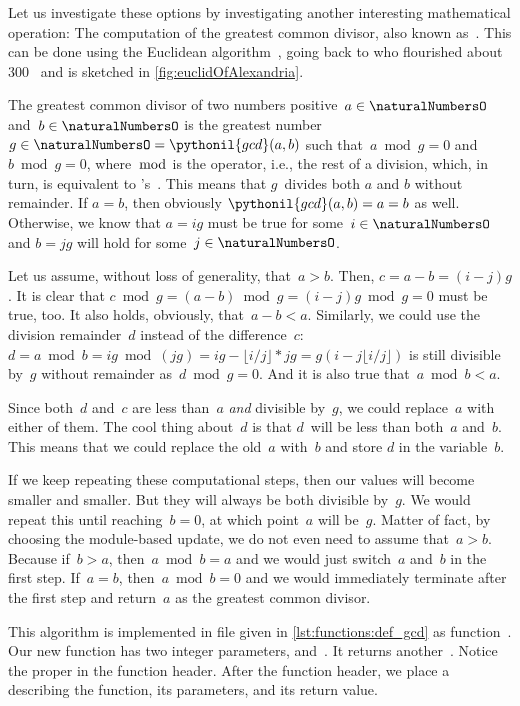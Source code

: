 Let us investigate these options by investigating another interesting mathematical operation:
The computation of the greatest common divisor, also known as~.
This can be done using the Euclidean algorithm~\cite{EHF2008EEOGTGOJLH11FEEEELIEILHIATBG11EAPWMETBFR:ENT,B1999FAOTBEA,TKY2016BEOEAOTCEG}, going back to \citeauthor{EHF2008EEOGTGOJLH11FEEEELIEILHIATBG11EAPWMETBFR:ENT} who flourished about 300~ and is sketched in \cref{fig:euclidOfAlexandria}.

The greatest common divisor of two numbers positive~$a\in\naturalNumbersO$ and~$b\in\naturalNumbersO$ is the greatest number~$g\in\naturalNumbersO=\pythonil{gcd}(a,b)$ such that~$a\bmod g=0$ and~$b \bmod g=0$, where~$\bmod$ is the  operator, i.e., the rest of a division, which, in turn, is equivalent to \python's~\pythonilIdx{\%}.
This means that $g$~divides both $a$ and $b$ without remainder.
If $a=b$, then obviously $\pythonil{gcd}(a,b)=a=b$ as well.
Otherwise, we know that $a=ig$ must be true for some~$i\in\naturalNumbersO$ and $b=jg$ will hold for some~$j\in\naturalNumbersO$.

Let us assume, without loss of generality, that~$a>b$.
Then, $c=a-b=(i-j)g$.
It is clear that $c\bmod g=(a-b)\bmod g=(i-j)g\bmod g = 0$ must be true, too.
It also holds, obviously, that~$a-b < a$.
Similarly, we could use the division remainder~$d$ instead of the difference~$c$:
$d=a\bmod b=ig\bmod (jg)=ig-\lfloor i/j\rfloor*jg=g(i-j\lfloor i/j\rfloor)$ is still divisible by~$g$ without remainder as~$d\bmod g=0$.
And it is also true that~$a\bmod b < a$.

Since both~$d$ and~$c$ are less than~$a$ \emph{and} divisible by~$g$, we could replace~$a$ with either of them.
The cool thing about~$d$ is that $d$~will be less than both~$a$ and~$b$.
This means that we could replace the old~$a$ with~$b$ and store $d$ in the variable~$b$.

If we keep repeating these computational steps, then our values will become smaller and smaller.
But they will always be both divisible by~$g$.
We would repeat this until reaching~$b=0$, at which point~$a$ will be~$g$.
Matter of fact, by choosing the module-based update, we do not even need to assume that~$a>b$.
Because if~$b>a$, then~$a \bmod b=a$ and we would just switch~$a$ and~$b$ in the first step.
If~$a=b$, then~$a \bmod b=0$ and we would immediately terminate after the first step and return~$a$ as the greatest common divisor.

This algorithm is implemented in file  given in \cref{lst:functions:def_gcd} as function~.
Our new function  has two integer parameters,  and~.
It returns another~.
Notice the proper  in the function header.
After the function header, we place a  describing the function, its parameters, and its return value.


